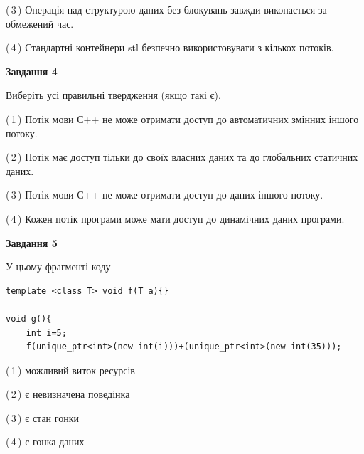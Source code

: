 \documentclass[12pt, ukrainian]{article}
\begin{document}
\begin {large}
{(\,3\,) Операція над структурою даних без блокувань завжди виконається за обмежений час.%

(\,4\,) Стандартні контейнери stl безпечно використовувати з кількох потоків.%



\begin{center}
\textbf{Завдання 4}
\end{center}
Виберіть усі правильні твердження (якщо такі є).\par
\vspace{2mm}

(\,1\,) Потік мови С++ не може отримати доступ до автоматичних змінних іншого потоку.%

(\,2\,) Потік має доступ тільки до своїх власних даних та до глобальних статичних даних.%

(\,3\,) Потік мови С++ не може отримати доступ до даних іншого потоку.%

(\,4\,) Кожен потік програми може мати доступ до динамічних даних програми.%



\begin{center}
\textbf{Завдання 5}
\end{center}
У цьому фрагменті коду
\begin{verbatim}
template <class T> void f(T a){}

void g(){
    int i=5;
    f(unique_ptr<int>(new int(i)))+(unique_ptr<int>(new int(35)));
\end{verbatim}
(\,1\,) можливий виток ресурсів%

(\,2\,) є невизначена поведінка%

(\,3\,) є стан гонки%

(\,4\,) є гонка даних%


}
\end {large}
\end{document}
